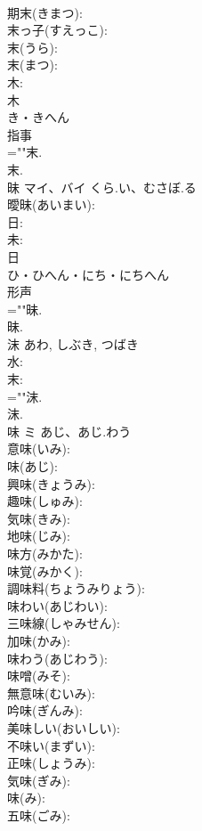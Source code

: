 \documentclass[8pt]{extreport}
\begin{document}
\begin{CJK}{UTF8}{min}
\\	期末(きまつ): 
\\	末っ子(すえっこ): 
\\	末(うら): 
\\	末(まつ): 
\\	木: 
\\	木	
\\	き・きへん	
\\	指事 
\\	=""末.
\\	末.
\\	昧	マイ、バイ	くら.い、むさぼ.る		
\\	曖昧(あいまい): 
\\	日: 
\\	未: 
\\	日	
\\	ひ・ひへん・にち・にちへん	
\\	形声 
\\	=""昧.
\\	昧.
\\	沫		あわ, しぶき, つばき				
\\	水: 
\\	末: 
\\	=""沫.
\\	沫.
\\	味	ミ	あじ、あじ.わう		
\\	意味(いみ): 
\\	味(あじ): 
\\	興味(きょうみ): 
\\	趣味(しゅみ): 
\\	気味(きみ): 
\\	地味(じみ): 
\\	味方(みかた): 
\\	味覚(みかく): 
\\	調味料(ちょうみりょう): 
\\	味わい(あじわい): 
\\	三味線(しゃみせん): 
\\	加味(かみ): 
\\	味わう(あじわう): 
\\	味噌(みそ): 
\\	無意味(むいみ): 
\\	吟味(ぎんみ): 
\\	美味しい(おいしい): 
\\	不味い(まずい): 
\\	正味(しょうみ): 
\\	気味(ぎみ): 
\\	味(み): 
\\	五味(ごみ): 

\end{CJK}
\end{document}
